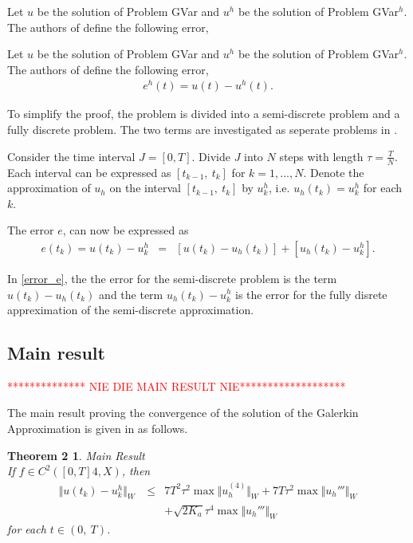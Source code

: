 \documentclass[../../main.tex]{subfiles}
\begin{document}
Let $u$ be the solution of Problem GVar and $u^h$ be the solution of Problem
GVar$^h$. The authors of \cite{BV13} define the following error,

Let $u$ be the solution of Problem GVar and $u^h$ be the solution of Problem GVar$^h$.
 The authors of \cite{BV13} define the following error,
\begin{eqnarray}
	e^h(t) = u(t) - u^h(t). \label{Error}
\end{eqnarray}

To simplify the proof, the problem is divided into a semi-discrete problem and a fully discrete problem. The two terms are investigated as seperate problems
in \cite{BV13}.

Consider the time interval $J = [0,T]$. Divide $J$ into $N$ steps with length $\tau = \frac{T}{N}$. Each interval can be expressed as $[t_{k-1}, \ t_k]$ for $k = 1,...,N$. Denote the approximation of $u_h$ on the interval $[t_{k-1}, \ t_k]$ by $u_k^h$, i.e. $u_h(t_k) = u_k^h$ for each $k$.

The error $e$, can now be expressed as
\begin{eqnarray}
	e(t_k) = u(t_k) - u^h_k & = & [u(t_k)-u_h(t_k)] + [u_h(t_k) - u^h_k]. \label{error_e}
\end{eqnarray}

In \eqref{error_e}, the the error for the semi-discrete problem is the term $u(t_k)-u_h(t_k)$ and the term $u_h(t_k) - u^h_k$ is the error for the fully disrete appreximation of the semi-discrete approximation.

\subsection{Main result}
\textcolor{red}{************** NIE DIE MAIN RESULT NIE*******************}

The main result proving the convergence of the solution of the Galerkin
Approximation is given in \cite{BV13} as follows.

\newtheorem*{DC_Thm5}{Theorem 2}
\begin{DC_Thm5}
	{Main Result}\\
	If $f\in C^{2}([0,T]4,X)$, then
	\begin{eqnarray*}
		\Vert u(t_{k})-u_{k}^{h}\Vert_{W}\ & \leq & 7T^{2}\tau^{2}\max\Vert u_{h}^{(4)}\Vert_{W}+7T\tau^{2}\max\Vert u_{h}'''\Vert_{W}\\
		& & + \sqrt{2K_{a}}\tau^{4}\max\Vert u_{h}'''\Vert_{W}
	\end{eqnarray*}
	for each $t\in(0,\ T)$.
\end{DC_Thm5}
\end{document}
